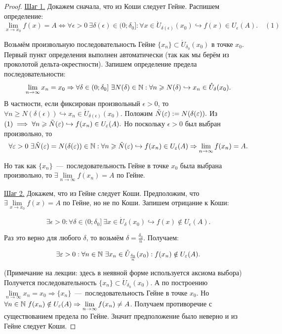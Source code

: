 \begin{proof}
    \underline{Шаг 1.} Докажем сначала, что из Коши следует Гейне. Распишем определение:
    $$ \lim\limits_{x\to x_{0}} f (x) = A \Leftrightarrow \forall \epsilon > 0 \ \exists \delta (\epsilon) \in (0; \delta_{0}]: \forall x \in \mathring{U}_{\delta (\epsilon)} (x_{0}) \hookrightarrow f (x) \in U_{\epsilon} (A). \quad (1)$$

    Возьмём произвольную последовательность Гейне $\{ x_{n} \} \subset \mathring{U}_{\delta_{0}} (x_{0})$ в точке $x_{0}$. Первый пункт определения выполнен автоматически (так как мы берём из проколотой дельта-окрестности). Запишем определение предела последовательности:
    $$ \lim\limits_{n\to \infty} x_{n} = x_{0} \Rightarrow \forall \delta \in (0; \delta_{0}] \ \exists N (\delta) \in \N: \forall n \geq N (\delta) \hookrightarrow x_{n} \in \mathring{U}_{\delta} (x_{0}).$$
    В частности, если фиксирован произвольный $\epsilon > 0$, то $\forall n \geq N (\delta (\epsilon) ) \hookrightarrow x_{n} \in \mathring{U}_{\delta (\epsilon)} (x_{0}).$ Положим $\Tilde{N} (\epsilon) := N (\delta (\epsilon)).$ Из $(1) \implies \forall n \geq \Tilde{N} (\epsilon) \hookrightarrow f (x_{n}) \in U_{\epsilon} (A).$ Но поскольку $\epsilon > 0$ был выбран произвольно, то
    $$ \forall \epsilon > 0 \  \exists \Tilde{N} (\epsilon) = N (\delta (\epsilon)) \in \N: \forall n \geq \Tilde{N} (\epsilon) \hookrightarrow f (x_{n}) \in U_{\epsilon} (A) \Rightarrow \lim\limits_{n\to \infty} f(x_{n}) = A.$$

    Но так как $\{ x_{n} \}$~---~последовательность Гейне в точке $x_{0}$ была выбрана произвольно, то  $\exists \lim\limits_{n\to \infty} f (x_{n}) = A$ по Гейне.

    \underline{Шаг 2.} Докажем, что из Гейне следует Коши. Предположим, что $\exists \lim\limits_{x\to x_{0}} f (x) = A$ по Гейне, но не по Коши. Запишем отрицание к Коши:

    $$ \exists \epsilon > 0: \forall \delta \in (0; \delta_{0}] \   \exists x \in \mathring{U}_{\delta} (x_{0}) \hookrightarrow f (x) \notin U_{\epsilon} (A).$$

    Раз это верно для любого $\delta$, то возьмём $\delta = \frac{\delta_{0}}{n}$. Получаем:

    $$ \exists \epsilon > 0: \forall n \in \N \  \exists x_{n} \in \mathring{U}_{\frac{\delta_{0}}{n}} (x_{0}): f (x_{n}) \notin U_{\epsilon} (A).$$

    (Примечание на лекции: здесь в неявной форме используется аксиома выбора) Получется последовательность $\{ x_{n} \} \subset \mathring{U}_{\delta_{0}} (x_{0})$. А по построению $\lim\limits_{n\to \infty} x_{n} = x_{0} \Rightarrow \{ x_{n} \}$~---~последовательность Гейне в точке $x_{0}$. Но $\forall n \in \N \  f (x_{n}) \notin U_{\epsilon} (A) \Rightarrow \lim\limits_{n\to \infty} f (x_{n}) \neq A$. Получаем противоречие с существованием предела по Гейне. Значит предположение было неверно и из Гейне следует Коши.
\end{proof}


